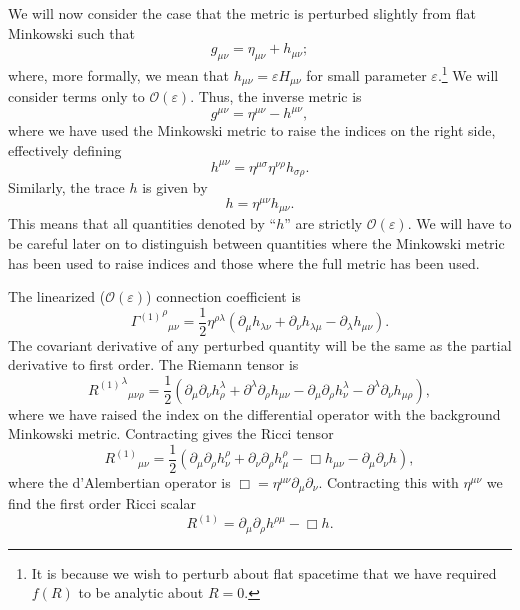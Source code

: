 \documentclass[a4paper, 11pt, titlepage, twoside]{report}
\newcommand{\order}[1]{\ensuremath{\mathcal{O}({#1})}}
\begin{document}
We will now consider the case that the metric is perturbed slightly from flat Minkowski such that
\begin{equation}
g_{\mu\nu} = \eta_{\mu\nu} + h_{\mu\nu};
\end{equation}
where, more formally, we mean that $h_{\mu\nu} = \varepsilon H_{\mu\nu}$ for small parameter $\varepsilon$.\footnote{It is because we wish to perturb about flat spacetime that we have required $f(R)$ to be analytic about $R = 0$.} We will consider terms only to $\order{\varepsilon}$. Thus, the inverse metric is
\begin{equation}
g^{\mu\nu} = \eta^{\mu\nu} - h^{\mu\nu},
\end{equation}
where we have used the Minkowski metric to raise the indices on the right side, effectively defining
\begin{equation}
h^{\mu\nu} = \eta^{\mu\sigma}\eta^{\nu\rho}h_{\sigma\rho}.
\end{equation}
Similarly, the trace $h$ is given by
\begin{equation}
h = \eta^{\mu\nu}h_{\mu\nu}.
\end{equation}
This means that all quantities denoted by ``$h$'' are strictly $\order{\varepsilon}$. We will have to be careful later on to distinguish between quantities where the Minkowski metric has been used to raise indices and those where the full metric has been used.

The linearized ($\order{\varepsilon}$) connection coefficient is
\begin{equation}
{{\Gamma^{(1)}}^\rho}_{\mu\nu} = \frac{1}{2}\eta^{\rho\lambda}(\partial_\mu h_{\lambda\nu} + \partial_\nu h_{\lambda\mu} - \partial_\lambda h_{\mu\nu}).
\label{eq:Lin_Gamma}
\end{equation}
The covariant derivative of any perturbed quantity will be the same as the partial derivative to first order. The Riemann tensor is
\begin{equation}
{{R^{(1)}}^\lambda}_{\mu\nu\rho} = \frac{1}{2}(\partial_\mu\partial_\nu h^\lambda_\rho + \partial^\lambda\partial_\rho h_{\mu\nu} - \partial_\mu\partial_\rho h^\lambda_\nu - \partial^\lambda\partial_\nu h_{\mu\rho}),
\label{eq:Lin_Riemann}
\end{equation}
where we have raised the index on the differential operator with the background Minkowski metric. Contracting gives the Ricci tensor
\begin{equation}
{R^{(1)}}_{\mu\nu} = \frac{1}{2}(\partial_\mu\partial_\rho h^\rho_\nu + \partial_\nu\partial_\rho h^\rho_\mu -\Box h_{\mu\nu} - \partial_\mu\partial_\nu h),
\label{eq:Ricci}
\end{equation}
where the d'Alembertian operator is $\Box = \eta^{\mu\nu}\partial_\mu\partial_\nu$. Contracting this with $\eta^{\mu\nu}$ we find the first order Ricci scalar
\begin{equation}
R^{(1)} = \partial_\mu\partial_\rho h^{\rho\mu} - \Box h.
\label{eq:Scalar}
\end{equation}
\end{document}
